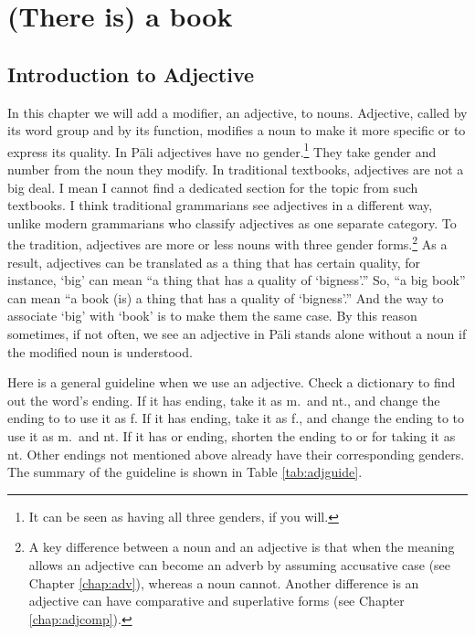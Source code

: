 \chapter{(There is) a  book}\label{chap:adj}

{}
\section*{Introduction to Adjective}

In this chapter we will add a modifier, an adjective, to nouns. Adjective, called  by its word group and  by its function, modifies a noun to make it more specific or to express its quality. In P\=ali adjectives have no gender.\footnote{It can be seen as having all three genders, if you will.} They take gender and number from the noun they modify. In traditional textbooks, adjectives are not a big deal. I mean I cannot find a dedicated section for the topic from such textbooks. I think traditional grammarians see adjectives in a different way, unlike modern grammarians who classify adjectives as one separate category. To the tradition, adjectives are more or less nouns with three gender forms.\footnote{A key difference between a noun and an adjective is that when the meaning allows an adjective can become an adverb by assuming accusative case (see Chapter \ref{chap:adv}), whereas a noun cannot. Another difference is an adjective can have comparative and superlative forms (see Chapter \ref{chap:adjcomp}).} As a result, adjectives can be translated as a thing that has certain quality, for instance, `big' can mean ``a thing that has a quality of `bigness'.'' So, ``a big book'' can mean ``a book (is) a thing that has a quality of `bigness'.'' And the way to associate `big' with `book' is to make them the same case. By this reason sometimes, if not often, we see an adjective in P\=ali stands alone without a noun if the modified noun is understood.

Here is a general guideline when we use an adjective. Check a dictionary to find out the word's ending. If it has  ending, take it as m.\ and nt., and change the ending to  to use it as f. If it has  ending, take it as f., and change the ending to  to use it as m.\ and nt. If it has  or  ending, shorten the ending to  or  for taking it as nt. Other endings not mentioned above already have their corresponding genders. The summary of the guideline is shown in Table \ref{tab:adjguide}.

